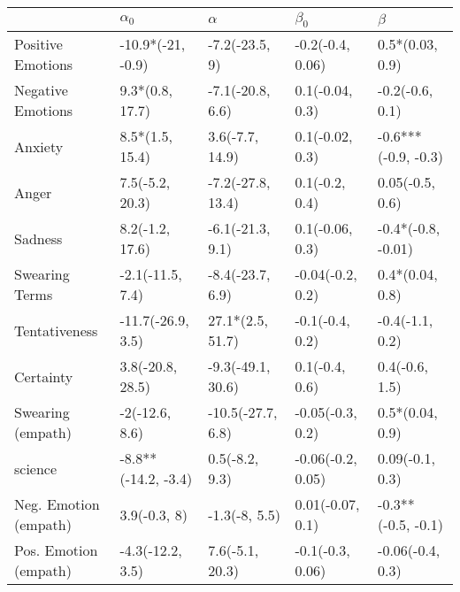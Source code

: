\begin{tabular}{lllll}
\toprule
{} &           $\alpha_0$ &           $\alpha$ &          $\beta_0$ &              $\beta$ \\
\midrule
Positive Emotions     &    -10.9*(-21, -0.9) &     -7.2(-23.5, 9) &   -0.2(-0.4, 0.06) &      0.5*(0.03, 0.9) \\
Negative Emotions     &      9.3*(0.8, 17.7) &   -7.1(-20.8, 6.6) &    0.1(-0.04, 0.3) &      -0.2(-0.6, 0.1) \\
Anxiety               &      8.5*(1.5, 15.4) &    3.6(-7.7, 14.9) &    0.1(-0.02, 0.3) &  -0.6***(-0.9, -0.3) \\
Anger                 &      7.5(-5.2, 20.3) &  -7.2(-27.8, 13.4) &     0.1(-0.2, 0.4) &      0.05(-0.5, 0.6) \\
Sadness               &      8.2(-1.2, 17.6) &   -6.1(-21.3, 9.1) &    0.1(-0.06, 0.3) &   -0.4*(-0.8, -0.01) \\
Swearing Terms        &     -2.1(-11.5, 7.4) &   -8.4(-23.7, 6.9) &   -0.04(-0.2, 0.2) &      0.4*(0.04, 0.8) \\
Tentativeness         &    -11.7(-26.9, 3.5) &   27.1*(2.5, 51.7) &    -0.1(-0.4, 0.2) &      -0.4(-1.1, 0.2) \\
Certainty             &     3.8(-20.8, 28.5) &  -9.3(-49.1, 30.6) &     0.1(-0.4, 0.6) &       0.4(-0.6, 1.5) \\
Swearing (empath)     &       -2(-12.6, 8.6) &  -10.5(-27.7, 6.8) &   -0.05(-0.3, 0.2) &      0.5*(0.04, 0.9) \\
science               &  -8.8**(-14.2, -3.4) &     0.5(-8.2, 9.3) &  -0.06(-0.2, 0.05) &      0.09(-0.1, 0.3) \\
Neg. Emotion (empath) &         3.9(-0.3, 8) &      -1.3(-8, 5.5) &   0.01(-0.07, 0.1) &   -0.3**(-0.5, -0.1) \\
Pos. Emotion (empath) &     -4.3(-12.2, 3.5) &    7.6(-5.1, 20.3) &   -0.1(-0.3, 0.06) &     -0.06(-0.4, 0.3) \\
\bottomrule
\end{tabular}
